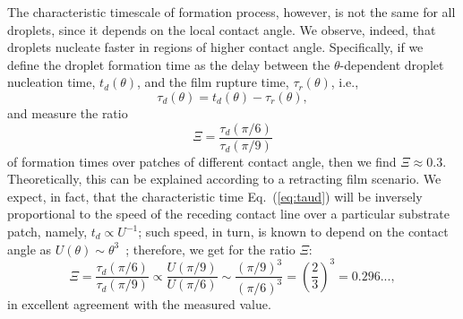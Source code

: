 The characteristic timescale of formation process, however, is not the same for all droplets, since it depends on the local contact angle.
We observe, indeed, that droplets nucleate faster in regions of higher contact angle. 
Specifically, if we define the droplet formation time as the delay between the $\theta$-dependent droplet nucleation time, $t_d(\theta)$, and the film rupture time, $\tau_r(\theta)$, i.e.,
\begin{equation}\label{eq:taud}
  \tau_d(\theta) = t_d(\theta) - \tau_r(\theta), 
\end{equation}
and measure the ratio
\begin{equation}\label{eq:time_ratio_delta8_substrate}
    \Xi = \frac{\tau_d(\pi/6)}{\tau_d(\pi/9)} 
\end{equation}
of formation times over patches of different contact angle, then we find $\Xi \approx 0.3$.
Theoretically, this can be explained according to a retracting film scenario. 
We expect, in fact, that the characteristic time Eq.~(\ref{eq:taud}) will be inversely proportional to the speed of the receding contact line over a particular substrate patch, namely, $t_d \propto U^{-1}$; such speed, in turn, is known to depend on the contact angle as $U(\theta) \sim \theta^3$~\cite{snoeijerAsymptoticAnalysisDewetting2010}; therefore, we get for the ratio $\Xi$:
\begin{equation}\label{eq:ratio_U_theta_qubed_1/3}
  \Xi = \frac{\tau_d(\pi/6)}{\tau_d(\pi/9)}  \propto  {\frac{U(\pi/9)}{U(\pi/6)} \sim \frac{\left(\pi/9\right)^3}{\left(\pi/6\right)^3} = \left(\frac{2}{3}\right)^3 = 0.296...},
\end{equation}
in excellent agreement with the measured value.
